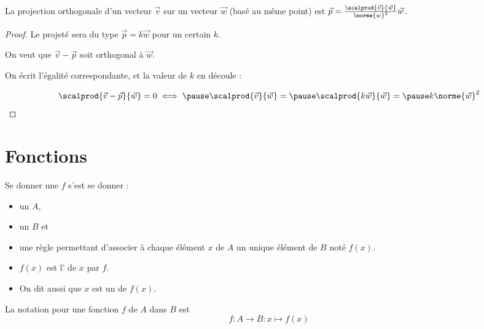 \documentclass[french,xcolor=svgnames]{beamer}
\begin{document}
\begin{frame}
  \begin{corollary}La projection orthogonale d'un vecteur \(\vec{v}\) sur un vecteur \(\vec{w}\) (basé au même point) est\pause{}
    \(\vec p = \frac{\scalprod{\vec{v}}{\vec{w}}}{\norme{w}^{2}} \vec{w}\).
  \end{corollary}\pause
  \begin{proof}
    Le projeté sera du type \(\vec{p} = k \vec{w}\) pour un certain \(k\).\pause
    
    On veut que \(\vec{v} - \vec{p}\) soit orthogonal à \(\vec{w}\).\pause

    On écrit l'égalité correspondante, et la valeur de \(k\) en découle :\pause{}

    \begin{equation*}
      \scalprod{\vec{v}-\vec{p}}{\vec{w}} = 0 \iff\pause \scalprod{\vec{v}}{\vec{w}} =\pause \scalprod{k\vec{w}}{\vec{w}} =\pause k \norme{\vec{w}}^{2}
    \end{equation*}
  \end{proof}
\end{frame}

\section{Fonctions}
\begin{frame}
  \begin{definition}
    Se donner une  $f$\pause{} s'est se donner :
    \begin{itemize}
    \item un  $A$,\pause{}
    \item un  $B$ et\pause{}
    \item une règle permettant d'associer à chaque élément $x$ de $A$\pause{} un unique élément de $B$ noté \(f(x)\).
    \end{itemize}

    \begin{itemize}
    \item \(f(x)\) est l' de $x$ par $f$.\pause{}
    \item On dit aussi que \(x\) est un  de \(f(x)\).
    \end{itemize}\pause{}

    La notation pour une fonction $f$ de $A$ dans $B$ est\pause{}
    \begin{equation*}
      f : A \to B : x \mapsto f(x)
    \end{equation*}
  \end{definition}
\end{frame}
\end{document}
